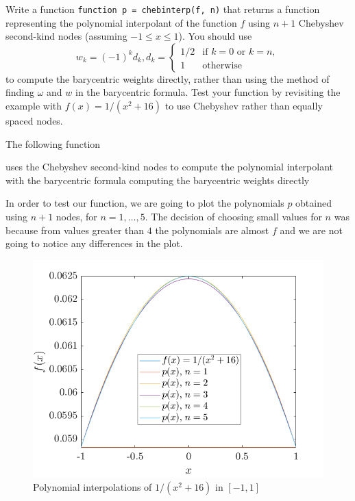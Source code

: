 \begin{statement}{6}
  Write a function \texttt{function p = chebinterp(f, n)}
  that returns a function representing the polynomial interpolant
  of the function $f$ using $n + 1$ Chebyshev second-kind nodes (assuming $-1 \leq x \leq 1$).
  You should use
  \[
    w_k = (-1)^k d_k,
    d_k = \begin{cases}
      1/2 & \text{if $k = 0$ or $k = n$},\\
      1 & \text{otherwise}
    \end{cases}
  \]
  to compute the barycentric weights directly, rather than using the method of finding
  $\omega$ and $w$ in the barycentric formula.
  Test your function by revisiting the example with $f(x) = 1 / (x^2 + 16)$ to
  use Chebyshev rather than equally spaced nodes.
\end{statement}

\begin{solution}
  The following function
  
  uses the Chebyshev second-kind nodes to compute the polynomial interpolant
  with the barycentric formula computing the barycentric weights directly
  
  In order to test our function, we are going to plot the polynomials $p$
  obtained using $n + 1$ nodes, for $n = 1, \dots, 5$.
  The decision of choosing small values for $n$ was because from values greater than $4$
  the polynomials are almost $f$ and we are not going to notice any differences in the plot.
  
  \begin{figure}[H]
    \centering
    \includegraphics[scale=0.5]{graphics/plot-06.png}
    \caption{Polynomial interpolations of $1 / (x^2 + 16)$ in $[-1, 1]$}
  \end{figure}
\end{solution}